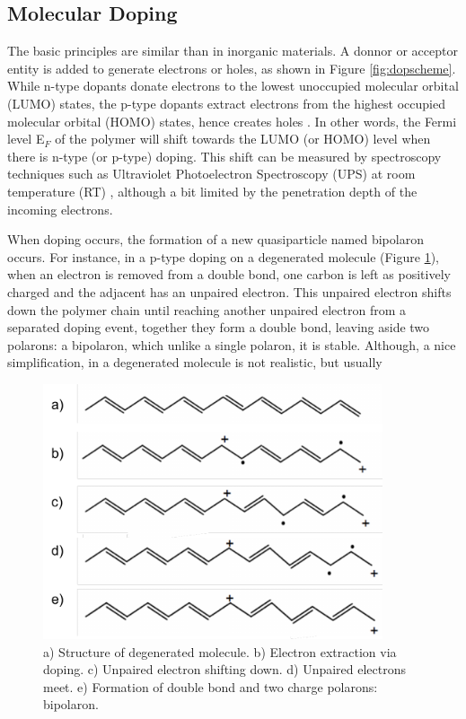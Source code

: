 \subsection{Molecular Doping} \label{subsec:moldop}
The basic principles are similar than in inorganic materials. A donnor or acceptor entity is added to generate electrons or holes, as shown in Figure \ref{fig:dopscheme}. While n-type dopants donate electrons to the lowest unoccupied molecular orbital (LUMO) states, the p-type dopants extract electrons from the highest occupied molecular orbital (HOMO) states, hence creates holes \cite{lussemDopingOrganicSemiconductors2013}. In other words, the Fermi level E$_{F}$ of the polymer will shift towards the LUMO (or HOMO) level when there is n-type (or p-type) doping. This shift can be measured by spectroscopy techniques such as Ultraviolet Photoelectron Spectroscopy (UPS) at room temperature (RT) \cite{tietzeFermiLevelShift2012}, although a bit limited by the penetration depth of the incoming electrons.

When doping occurs, %
the formation of a new quasiparticle named bipolaron occurs. For instance, in a p-type doping on a degenerated molecule (Figure \ref{fig:bipol}), when an electron is removed from a double bond, one carbon is left as positively charged and the adjacent has an unpaired electron. This unpaired electron shifts down the polymer chain until reaching another unpaired electron from a separated doping event, together they form a double bond, leaving aside two polarons: a bipolaron, which unlike a single polaron, it is stable. Although, a nice simplification, in a degenerated molecule is not realistic, but usually

\begin{figure}[h]
  \centering
  \includegraphics[width=10cm]{Images/pdf/bipolaron.pdf}
  \caption[Representation of bipolaron formation introduced via doping]{a) Structure of degenerated molecule. b) Electron extraction via doping. c) Unpaired electron shifting down. d) Unpaired electrons meet. e) Formation of double bond and two charge polarons: bipolaron.}
  \label{fig:bipol}
\end{figure}

